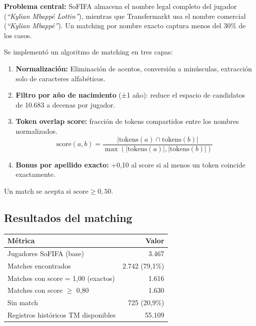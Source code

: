 \documentclass[12pt,a4paper]{report}
\begin{document}
\begin{dangerbox}
\textbf{Problema central:} SoFIFA almacena el nombre legal completo del jugador (\textit{``Kylian Mbappé Lottin''}), mientras que Transfermarkt usa el nombre comercial (\textit{``Kylian Mbappé''}). Un matching por nombre exacto captura menos del 30\% de los casos.
\end{dangerbox}

Se implementó un algoritmo de matching en tres capas:

\begin{enumerate}
  \item \textbf{Normalización:} Eliminación de acentos, conversión a minúsculas, extracción solo de caracteres alfabéticos.
  \item \textbf{Filtro por año de nacimiento} (±1 año): reduce el espacio de candidatos de 10.683 a decenas por jugador.
  \item \textbf{Token overlap score:} fracción de tokens compartidos entre los nombres normalizados.
  \begin{equation}
    \text{score}(a, b) = \frac{|\text{tokens}(a) \cap \text{tokens}(b)|}{\max(|\text{tokens}(a)|, |\text{tokens}(b)|)}
  \end{equation}
  \item \textbf{Bonus por apellido exacto:} +0{,}10 al score si al menos un token coincide exactamente.
\end{enumerate}

Un match se acepta si $\text{score} \geq 0{,}50$.

\subsection{Resultados del matching}

\begin{center}
\begin{tabular}{lr}
\toprule
\textbf{Métrica} & \textbf{Valor} \\
\midrule
Jugadores SoFIFA (base) & 3.467 \\
Matches encontrados & 2.742 (79{,}1\%) \\
Matches con score = 1{,}00 (exactos) & 1.616 \\
Matches con score $\geq$ 0{,}80 & 1.630 \\
Sin match & 725 (20{,}9\%) \\
Registros históricos TM disponibles & 55.109 \\
\bottomrule
\end{tabular}
\end{center}
\end{document}
